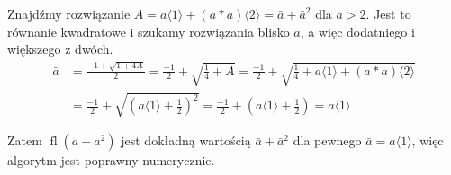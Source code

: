 \documentclass[a4paper, 12pt]{article}
\DeclareMathOperator{\fl}{fl}
\begin{document}
Znajdźmy rozwiązanie $A = a\langle 1 \rangle + (a * a) \langle 2 \rangle = \bar{a} + \bar{a}^2$ dla $a > 2$.
Jest to równanie kwadratowe i szukamy rozwiązania blisko $a$, a więc dodatniego i większego z dwóch.
\begin{align*}
\bar{a}
    &= \frac{-1 + \sqrt{1 + 4A}}{2} = \frac{-1}{2} + \sqrt{\frac{1}{4}+A}
    = \frac{-1}{2} + \sqrt{\frac{1}{4}+ a\langle 1 \rangle + (a * a) \langle 2 \rangle} \\
    &= \frac{-1}{2} + \sqrt{\left(a\langle 1 \rangle +\frac{1}{2}\right)^2 } 
    = \frac{-1}{2} + \left( a\langle 1 \rangle +\frac{1}{2} \right) = a \langle 1 \rangle
\end{align*}

Zatem $\fl(a + a^2)$ jest dokładną wartością $\bar{a} + \bar{a}^2$ dla pewnego $\bar{a} = a\langle 1 \rangle$, więc
algorytm jest poprawny numerycznie.
\end{document}
